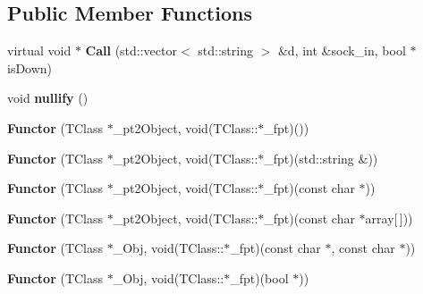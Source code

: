 \subsection*{Public Member Functions}
\begin{DoxyCompactItemize}
\item 
virtual void $\ast$ {\bfseries Call} (std\+::vector$<$ std\+::string $>$ \&d, int \&sock\+\_\+in, bool $\ast$is\+Down)\hypertarget{classFunctor_a10ea65d5d5e773f153b7bc2f6dc70b53}{}\label{classFunctor_a10ea65d5d5e773f153b7bc2f6dc70b53}

\item 
void {\bfseries nullify} ()\hypertarget{classFunctor_a9c1880e746aa15c3a656c44f606ac395}{}\label{classFunctor_a9c1880e746aa15c3a656c44f606ac395}

\item 
{\bfseries Functor} (T\+Class $\ast$\+\_\+pt2\+Object, void(T\+Class\+::$\ast$\+\_\+fpt)())\hypertarget{classFunctor_a9d17f69403a92f81099e1c4107aedf81}{}\label{classFunctor_a9d17f69403a92f81099e1c4107aedf81}

\item 
{\bfseries Functor} (T\+Class $\ast$\+\_\+pt2\+Object, void(T\+Class\+::$\ast$\+\_\+fpt)(std\+::string \&))\hypertarget{classFunctor_af6033489a0f82bd3fd986e2b3a5a383a}{}\label{classFunctor_af6033489a0f82bd3fd986e2b3a5a383a}

\item 
{\bfseries Functor} (T\+Class $\ast$\+\_\+pt2\+Object, void(T\+Class\+::$\ast$\+\_\+fpt)(const char $\ast$))\hypertarget{classFunctor_adda4c4c0485cf3fa401e21c77ca8afd1}{}\label{classFunctor_adda4c4c0485cf3fa401e21c77ca8afd1}

\item 
{\bfseries Functor} (T\+Class $\ast$\+\_\+pt2\+Object, void(T\+Class\+::$\ast$\+\_\+fpt)(const char $\ast$array\mbox{[}$\,$\mbox{]}))\hypertarget{classFunctor_ad86c9ae148566745ae632bc204b8213b}{}\label{classFunctor_ad86c9ae148566745ae632bc204b8213b}

\item 
{\bfseries Functor} (T\+Class $\ast$\+\_\+\+Obj, void(T\+Class\+::$\ast$\+\_\+fpt)(const char $\ast$, const char $\ast$))\hypertarget{classFunctor_abe44e9ce8dc74f5dd02ddcf8897c1368}{}\label{classFunctor_abe44e9ce8dc74f5dd02ddcf8897c1368}

\item 
{\bfseries Functor} (T\+Class $\ast$\+\_\+\+Obj, void(T\+Class\+::$\ast$\+\_\+fpt)(bool $\ast$))\hypertarget{classFunctor_adafd41007717fd53b0a118f6fcdffeec}{}\label{classFunctor_adafd41007717fd53b0a118f6fcdffeec}


\end{DoxyCompactItemize}
